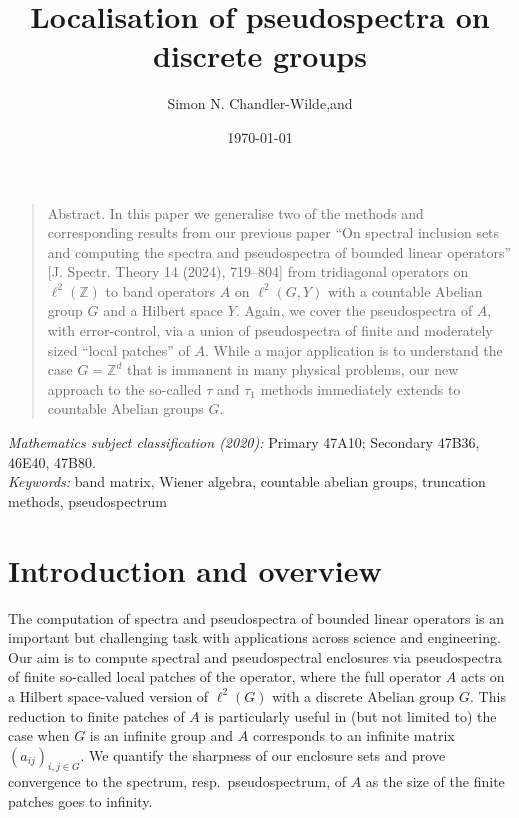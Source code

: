 \documentclass{article}
\newcommand\Z{{\mathbb Z}}
\numberwithin{equation}{section}   %
\numberwithin{figure}{section}  %
\begin{document}
\title{\bf Localisation of pseudospectra on discrete groups}
\author{{\sc Simon N. Chandler-Wilde},\quad and}
\date{\today}
\maketitle
\begin{quote}
\renewcommand{\baselinestretch}{1.0}
\footnotesize {\sc Abstract.} 
In this paper we generalise two of the methods and corresponding results from our previous paper ``On spectral inclusion sets and computing the spectra and pseudospectra of bounded linear operators'' [J. Spectr. Theory 14 (2024), 719–804] from tridiagonal operators on $\ell^2(\Z)$ to band operators $A$ on $\ell^2(G,Y)$ with a countable Abelian group $G$ and a Hilbert space $Y$. Again, we cover the pseudospectra of $A$, with error-control, via a union of pseudospectra of finite and moderately sized ``local patches'' of $A$. %
While a major application is to understand the case $G=\Z^d$ that is immanent in many physical problems, our new approach to the so-called $\tau$ and $\tau_1$ methods immediately extends to countable Abelian groups $G$. 
\end{quote}


\noindent
{\it Mathematics subject classification (2020):} Primary 47A10; Secondary 47B36, 46E40, 47B80.\\%
{\it Keywords:} band matrix, Wiener algebra, countable abelian groups, truncation methods, pseudospectrum

\section{Introduction and overview}
The computation of spectra and pseudospectra of bounded linear operators is an important but challenging task with applications across science and engineering. Our aim is to compute spectral and pseudospectral enclosures via pseudospectra of finite so-called local patches of the operator, where the full operator $A$ acts on a Hilbert space-valued version of $\ell^2(G)$ with a discrete Abelian group $G$. This reduction to finite patches of $A$ is particularly useful in (but not limited to) the case when $G$ is an infinite group and $A$ corresponds to an infinite matrix $(a_{ij})_{i,j\in G}$. We quantify the sharpness of our enclosure sets and prove convergence to the spectrum, resp.~pseudospectrum, of $A$ as the size of the finite patches goes to infinity.
\end{document}
